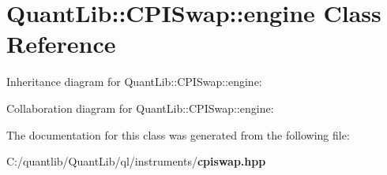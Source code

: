 \section{Quant\+Lib\+:\+:C\+P\+I\+Swap\+:\+:engine Class Reference}
\label{class_quant_lib_1_1_c_p_i_swap_1_1engine}


Inheritance diagram for Quant\+Lib\+:\+:C\+P\+I\+Swap\+:\+:engine\+:


Collaboration diagram for Quant\+Lib\+:\+:C\+P\+I\+Swap\+:\+:engine\+:


The documentation for this class was generated from the following file\+:\begin{DoxyCompactItemize}
\item 
C\+:/quantlib/\+Quant\+Lib/ql/instruments/{\bf cpiswap.\+hpp}\end{DoxyCompactItemize}
